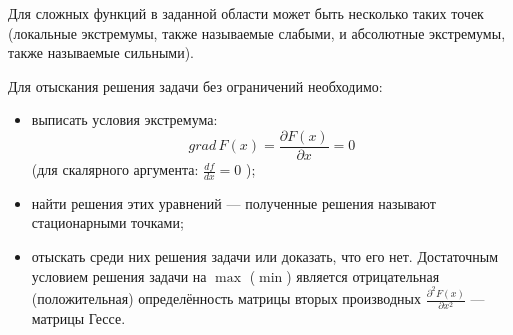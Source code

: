 \documentclass[preprint,russian,a5paper,10pt,twoside,mediummath]{ncc}
\begin{document}
Для сложных функций в заданной области может быть несколько таких точек (локальные экстремумы, также называемые слабыми, и абсолютные экстремумы, также называемые сильными).

Для отыскания решения задачи без ограничений необходимо:
\begin{itemize}
\item выписать условия экстремума:
\begin{equation}\label{equ:extremum:general}
grad \, F \left( x \right) = \frac{\partial F\left( x \right)}{\partial x} = 0
\end{equation}
(для скалярного аргумента: $\frac{df}{dx}=0$ );
\item найти решения этих уравнений --- полученные решения называют стационарными точками;
\item отыскать среди них решения задачи или доказать, что его нет. Достаточным условием решения задачи на $\max$ ($\min$) является отрицательная (положительная) определённость матрицы вторых производных $ \frac{ \partial ^ 2 F \left( x \right) }{ \partial x ^ 2} $ --- матрицы Гессе.
\end{itemize}
\end{document}
